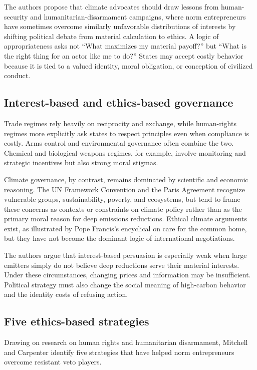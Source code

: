 The authors propose that climate advocates should draw lessons from human-security and humanitarian-disarmament campaigns, where norm entrepreneurs have sometimes overcome similarly unfavorable distributions of interests by shifting political debate from material calculation to ethics. A logic of appropriateness asks not ``What maximizes my material payoff?'' but ``What is the right thing for an actor like me to do?'' States may accept costly behavior because it is tied to a valued identity, moral obligation, or conception of civilized conduct.

\subsection{Interest-based and ethics-based governance}

Trade regimes rely heavily on reciprocity and exchange, while human-rights regimes more explicitly ask states to respect principles even when compliance is costly. Arms control and environmental governance often combine the two. Chemical and biological weapons regimes, for example, involve monitoring and strategic incentives but also strong moral stigmas.

Climate governance, by contrast, remains dominated by scientific and economic reasoning. The UN Framework Convention and the Paris Agreement recognize vulnerable groups, sustainability, poverty, and ecosystems, but tend to frame these concerns as contexts or constraints on climate policy rather than as the primary moral reason for deep emissions reductions. Ethical climate arguments exist, as illustrated by Pope Francis's encyclical on care for the common home, but they have not become the dominant logic of international negotiations.

The authors argue that interest-based persuasion is especially weak when large emitters simply do not believe deep reductions serve their material interests. Under these circumstances, changing prices and information may be insufficient. Political strategy must also change the social meaning of high-carbon behavior and the identity costs of refusing action.

\subsection{Five ethics-based strategies}

Drawing on research on human rights and humanitarian disarmament, Mitchell and Carpenter identify five strategies that have helped norm entrepreneurs overcome resistant veto players.

